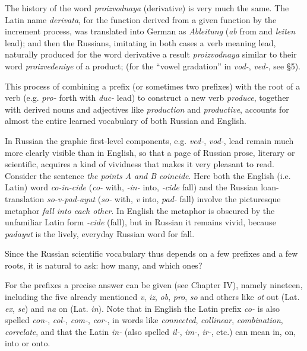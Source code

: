 The history of the word \emph{proizvodnaya} (derivative) is very much the same. The Latin name \emph{derivata}, for the function derived from a given function by the increment process, was translated into German as \emph{Ableitung} (\emph{ab} from and \emph{leiten} lead); and then the Russians, imitating in both cases a verb meaning lead, naturally produced for the word derivative a result \emph{proizvodnaya} similar to their word \emph{proizvedeniye} of a product; (for the ``vowel gradation'' in \emph{vod-}, \emph{ved-}, see §5).


This process of combining a prefix (or sometimes two prefixes) with the root of a verb (e.g. \emph{pro-} forth with \emph{duc-} lead) to construct a new verb \emph{produce}, together with derived nouns and adjectives like \emph{production} and \emph{productive}, accounts for almost the entire learned vocabulary of both Russian and English.

In Russian the graphic first-level components, e.g. \emph{ved-}, \emph{vod-}, lead remain much more clearly visible than in English, so that a page of Russian prose, literary or scientific, acquires a kind of vividness that makes it very pleasant to read. Consider the sentence \emph{the points A and B coincide}. Here both the English (i.e. Latin) word \emph{co-in-cide} (\emph{co-} with, \emph{-in-} into, \emph{-cide} fall) and the Russian loan-translation \emph{so-v-pad-ayut} (\emph{so-} with, \emph{v} into, \emph{pad-} fall) involve the picturesque metaphor \emph{fall into each other}. In English the metaphor is obscured by the unfamiliar Latin form \emph{-cide} (fall), but in Russian it remains vivid, because \emph{padayut} is the lively, everyday Russian word for fall.

Since the Russian scientific vocabulary thus depends on a few prefixes and a few roots, it is natural to ask: how many, and which ones?

For the prefixes a precise answer can be given (see Chapter IV), namely nineteen, including the five already mentioned \emph{v}, \emph{iz}, \emph{ob}, \emph{pro}, \emph{so} and others like \emph{ot} out (Lat. \emph{ex}, \emph{se}) and \emph{na} on (Lat. \emph{in}). Note that in English the Latin prefix \emph{co-} is also spelled \emph{con-}, \emph{col-}, \emph{com-}, \emph{cor-}, in words like \emph{connected}, \emph{collinear}, \emph{combination}, \emph{correlate}, and that the Latin \emph{in-} (also spelled \emph{il-}, \emph{im-}, \emph{ir-}, etc.) can mean in, on, into or onto.


